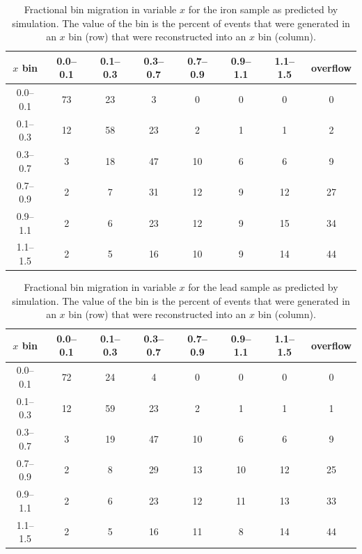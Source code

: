 \documentclass[aps,preprint,showpacs,superscriptaddress]{revtex4} %
\newcommand{\Xbj}{\ensuremath{x}\xspace}
\begin{document}
\begingroup
\squeezetable
\begin{table}
\begin{tabular}{c|ccccccc}
\hline \hline
\Xbj bin & 0.0--0.1 & 0.1--0.3 & 0.3--0.7 & 0.7--0.9 & 0.9--1.1 & 1.1--1.5 & overflow \\ 
\hline
0.0--0.1 & 73 & 23 & 3 & 0 & 0 & 0 & 0 \\ 
0.1--0.3 & 12 & 58 & 23 & 2 & 1 & 1 & 2 \\ 
0.3--0.7 & 3 & 18 & 47 & 10 & 6 & 6 & 9 \\ 
0.7--0.9 & 2 & 7 & 31 & 12 & 9 & 12 & 27 \\ 
0.9--1.1 & 2 & 6 & 23 & 12 & 9 & 15 & 34 \\ 
1.1--1.5 & 2 & 5 & 16 & 10 & 9 & 14 & 44 \\ 
\hline \hline
\end{tabular}
\caption{Fractional bin migration in variable \Xbj for the iron sample as predicted by simulation.  The value of the bin is the percent of events that were generated in an \Xbj bin (row) that were reconstructed into an \Xbj bin (column).}
\label{tab:x_26_migration_table}
\end{table}
\endgroup


\begingroup
\squeezetable
\begin{table}
\begin{tabular}{c|ccccccc}
\hline \hline
\Xbj bin & 0.0--0.1 & 0.1--0.3 & 0.3--0.7 & 0.7--0.9 & 0.9--1.1 & 1.1--1.5 & overflow \\ 
\hline
0.0--0.1 & 72 & 24 & 4 & 0 & 0 & 0 & 0 \\ 
0.1--0.3 & 12 & 59 & 23 & 2 & 1 & 1 & 1 \\ 
0.3--0.7 & 3 & 19 & 47 & 10 & 6 & 6 & 9 \\ 
0.7--0.9 & 2 & 8 & 29 & 13 & 10 & 12 & 25 \\ 
0.9--1.1 & 2 & 6 & 23 & 12 & 11 & 13 & 33 \\ 
1.1--1.5 & 2 & 5 & 16 & 11 & 8 & 14 & 44 \\ 
\hline \hline
\end{tabular}
\caption{Fractional bin migration in variable \Xbj for the lead sample as predicted by simulation.  The value of the bin is the percent of events that were generated in an \Xbj bin (row) that were reconstructed into an \Xbj bin (column).}
\label{tab:x_82_migration_table}
\end{table}
\endgroup
\end{document}
